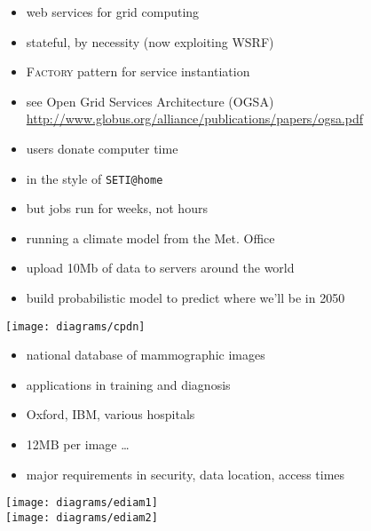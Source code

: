 \documentclass{sepslide-soa-faked} %
\begin{document}
\begin{slide}
\begin{itemize}
\item web services for grid computing
\item stateful, by necessity (now exploiting WSRF)
\item \textsc{Factory} pattern for service instantiation
\item see Open Grid Services Architecture (OGSA) \smallskip\\
\small
\url{http://www.globus.org/alliance/publications/papers/ogsa.pdf}
\end{itemize}
\end{slide}

\begin{slide}
\begin{minipage}{0.5\linewidth}\raggedright
\begin{itemize}
\item users donate computer time
\item in the style of \texttt{SETI@home}
\item but jobs run for weeks, not hours
\item running a climate model from the Met. Office
\item upload 10Mb of data to servers around the world
\item build probabilistic model to predict where we'll be in 2050
\end{itemize}
\end{minipage}
\qquad
\begin{minipage}{0.4\linewidth}
\begin{flushright}
\texttt{[image: diagrams/cpdn]}
\end{flushright}
\end{minipage}\hfill
\end{slide}

\begin{slide}
\begin{minipage}{0.5\linewidth}\raggedright
\begin{itemize}
\item national database of mammographic images
\item applications in training and diagnosis
\item Oxford, IBM, various hospitals
\item 12MB per image \ldots
\item major requirements in security, data location,
	access times
\end{itemize}
\end{minipage}
\qquad
\begin{minipage}{0.4\linewidth}
\begin{flushleft}
\texttt{[image: diagrams/ediam1]}
\bigskip \\
\texttt{[image: diagrams/ediam2]}
\end{flushleft}
\end{minipage}
\end{slide}
\end{document}
